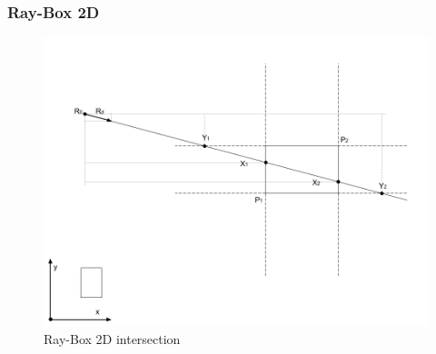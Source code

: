 \subsubsection{Ray-Box 2D}

\begin{figure}[H]
\caption{Ray-Box 2D intersection}
\label{fig:ray-box-2d}
\centering
\includegraphics[width=\linewidth]{Figures/ray-box-2d-intersection.png}
\decoRule
\end{figure}

